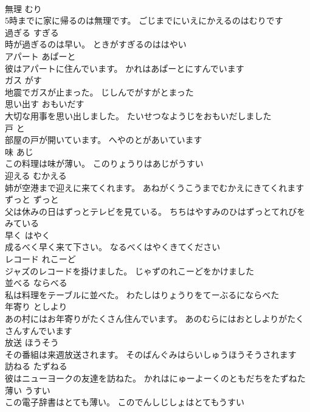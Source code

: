 \documentclass[8pt]{extreport}
\begin{document}
\begin{CJK}{UTF8}{min}
\\	無理	むり	
\\	5時までに家に帰るのは無理です。	ごじまでにいえにかえるのはむりです	
\\	過ぎる	すぎる	
\\	時が過ぎるのは早い。	ときがすぎるのははやい	
\\	アパート	あぱーと	
\\	彼はアパートに住んでいます。	かれはあぱーとにすんでいます	
\\	ガス	がす	
\\	地震でガスが止まった。	じしんでがすがとまった	
\\	思い出す	おもいだす	
\\	大切な用事を思い出しました。	たいせつなようじをおもいだしました	
\\	戸	と	
\\	部屋の戸が開いています。	へやのとがあいています	
\\	味	あじ	
\\	この料理は味が薄い。	このりょうりはあじがうすい	
\\	迎える	むかえる	
\\	姉が空港まで迎えに来てくれます。	あねがくうこうまでむかえにきてくれます	
\\	ずっと	ずっと	
\\	父は休みの日はずっとテレビを見ている。	ちちはやすみのひはずっとてれびをみている	
\\	早く	はやく	
\\	成るべく早く来て下さい。	なるべくはやくきてください	
\\	レコード	れこーど	
\\	ジャズのレコードを掛けました。	じゃずのれこーどをかけました	
\\	並べる	ならべる	
\\	私は料理をテーブルに並べた。	わたしはりょうりをてーぶるにならべた	
\\	年寄り	としより	
\\	あの村にはお年寄りがたくさん住んでいます。	あのむらにはおとしよりがたくさんすんでいます	
\\	放送	ほうそう	
\\	その番組は来週放送されます。	そのばんぐみはらいしゅうほうそうされます	
\\	訪ねる	たずねる	
\\	彼はニューヨークの友達を訪ねた。	かれはにゅーよーくのともだちをたずねた	
\\	薄い	うすい	
\\	この電子辞書はとても薄い。	このでんしじしょはとてもうすい	

\end{CJK}
\end{document}
